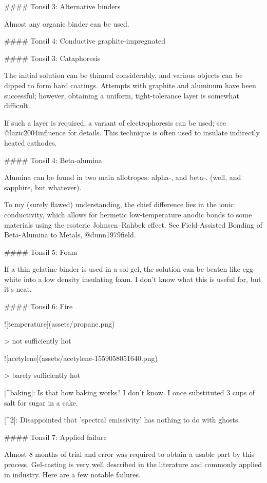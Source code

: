 \documentclass[fleqn,10pt]{article}
\begin{document}
#### Tonsil 3: Alternative binders

Almost any organic binder can be used.

#### Tonsil 4: Conductive graphite-impregnated 



#### Tonsil 3: Cataphoresis

The initial solution can be thinned considerably, and various objects can be dipped to form hard coatings. Attempts with graphite and aluminum have been successful; however, obtaining a uniform, tight-tolerance layer is somewhat difficult. 

If such a layer is required, a variant of electrophoresis can be used; see @lazic2004influence for details. This technique is often used to insulate indirectly heated cathodes.

#### Tonsil 4: Beta-alumina

Alumina can be found in two main allotropes: alpha-, and beta-. (well, and sapphire, but whatever).

To my (surely flawed) understanding, the chief difference lies in the ionic conductivity, which allows for hermetic low-temperature anodic bonds to some materials using the esoteric Johnsen–Rahbek effect. See Field-Assisted Bonding of Beta-Alumina to Metals, @dunn1979field.

#### Tonsil 5: Foam

If a thin gelatine binder is used in a sol-gel, the solution can be beaten like egg white into a low density insulating foam. I don't know what this is useful for, but it's neat.

#### Tonsil 6: Fire

![temperature](assets/propane.png)

> not sufficiently hot

![acetylene](assets/acetylene-1559058051640.png)

> barely sufficiently hot



[^baking]: Is that how baking works? I don't know. I once substituted 3 cups of salt for sugar in a cake.

[^2]: Disappointed that 'spectral emissivity' has nothing to do with ghosts.





#### Tonsil 7: Applied failure

Almost 8 months of trial and error was required to obtain a usable part by this process. Gel-casting is very well described in the literature and commonly applied in industry.  Here are a few notable failures.
\end{document}
